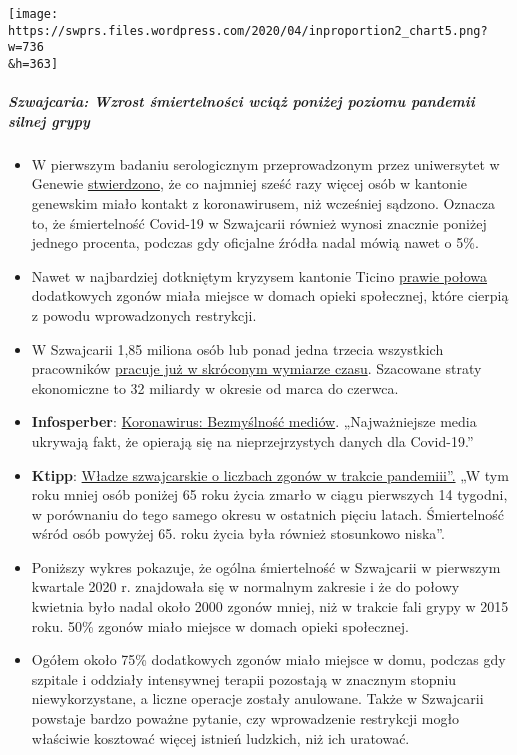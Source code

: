 \texttt{[image: https://swprs.files.wordpress.com/2020/04/inproportion2\_chart5.png?w=736\\\&h=363]}

\hypertarget{szwajcaria-wzrost-ux15bmiertelnoux15bci-wciux105ux17c-poniux17cej-poziomu-pandemii-silnej-grypy}{%
\subparagraph{Szwajcaria: Wzrost śmiertelności wciąż poniżej poziomu
pandemii silnej
grypy}\label{szwajcaria-wzrost-ux15bmiertelnoux15bci-wciux105ux17c-poniux17cej-poziomu-pandemii-silnej-grypy}}

\begin{itemize}
\tightlist
\item
  W pierwszym badaniu serologicznym przeprowadzonym przez uniwersytet w
  Genewie
  \href{https://www.hug-ge.ch/medias/communique-presse/seroprevalence-covid-19-premiere-estimation}{stwierdzono},
  że co najmniej sześć razy więcej osób w kantonie genewskim miało
  kontakt z koronawirusem, niż wcześniej sądzono. Oznacza to, że
  śmiertelność Covid-19 w Szwajcarii również wynosi znacznie poniżej
  jednego procenta, podczas gdy oficjalne źródła nadal mówią nawet o
  5\%.
\item
  Nawet w najbardziej dotkniętym kryzysem kantonie Ticino
  \href{https://www.bluewin.ch/de/news/schweiz/sp-chef-levrat-will-die-reichen-schropfen-383977.html}{prawie
  połowa} dodatkowych zgonów miała miejsce w domach opieki społecznej,
  które cierpią z powodu wprowadzonych restrykcji.
\item
  W Szwajcarii 1,85 miliona osób lub ponad jedna trzecia wszystkich
  pracowników
  \href{https://www.bluewin.ch/de/news/schweiz/sp-chef-levrat-will-die-reichen-schropfen-383977.html}{pracuje
  już w skróconym wymiarze czasu}. Szacowane straty ekonomiczne to 32
  miliardy w okresie od marca do czerwca.
\item
  \textbf{Infosperber}:
  \href{https://www.infosperber.ch/Artikel/Medien/Corona-NZZ-deckt-das-Nachplappern-anderer-Medien-auf}{Koronawirus:
  Bezmyślność mediów}. „Najważniejsze media ukrywają fakt, że opierają
  się na nieprzejrzystych danych dla Covid-19.''
\item
  \textbf{Ktipp}:
  \href{https://www.ktipp.ch/artikel/artikeldetail/bund-fast-alle-zahlen-ohne-gewaehr/}{Władze
  szwajcarskie o liczbach zgonów w trakcie pandemiii''.} „W tym roku
  mniej osób poniżej 65 roku życia zmarło w ciągu pierwszych 14 tygodni,
  w porównaniu do tego samego okresu w ostatnich pięciu latach.
  Śmiertelność wśród osób powyżej 65. roku życia była również stosunkowo
  niska''.
\item
  Poniższy wykres pokazuje, że ogólna śmiertelność w Szwajcarii w
  pierwszym kwartale 2020 r. znajdowała się w normalnym zakresie i że do
  połowy kwietnia było nadal około 2000 zgonów mniej, niż w trakcie fali
  grypy w 2015 roku. 50\% zgonów miało miejsce w domach opieki
  społecznej.
\item
  Ogółem około 75\% dodatkowych zgonów miało miejsce w domu, podczas gdy
  szpitale i oddziały intensywnej terapii pozostają w znacznym stopniu
  niewykorzystane, a liczne operacje zostały anulowane. Także w
  Szwajcarii powstaje bardzo poważne pytanie, czy wprowadzenie
  restrykcji mogło właściwie kosztować więcej istnień ludzkich, niż ich
  uratować.
\end{itemize}

